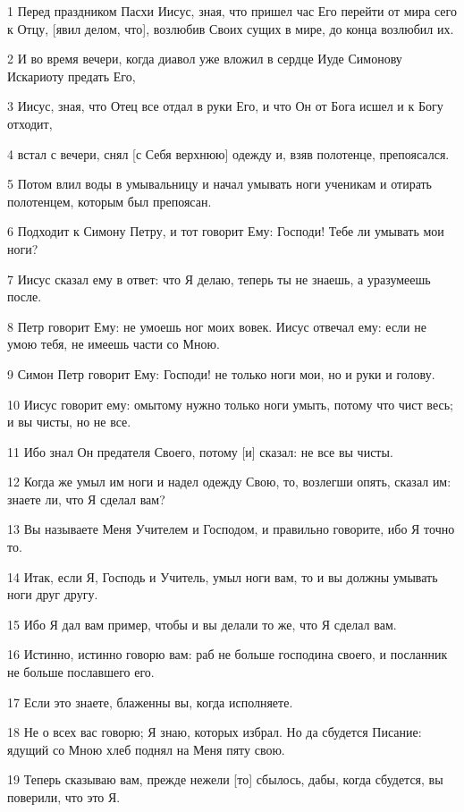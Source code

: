\par 1 Перед праздником Пасхи Иисус, зная, что пришел час Его перейти от мира сего к Отцу, [явил делом, что], возлюбив Своих сущих в мире, до конца возлюбил их.
\par 2 И во время вечери, когда диавол уже вложил в сердце Иуде Симонову Искариоту предать Его,
\par 3 Иисус, зная, что Отец все отдал в руки Его, и что Он от Бога исшел и к Богу отходит,
\par 4 встал с вечери, снял [с Себя верхнюю] одежду и, взяв полотенце, препоясался.
\par 5 Потом влил воды в умывальницу и начал умывать ноги ученикам и отирать полотенцем, которым был препоясан.
\par 6 Подходит к Симону Петру, и тот говорит Ему: Господи! Тебе ли умывать мои ноги?
\par 7 Иисус сказал ему в ответ: что Я делаю, теперь ты не знаешь, а уразумеешь после.
\par 8 Петр говорит Ему: не умоешь ног моих вовек. Иисус отвечал ему: если не умою тебя, не имеешь части со Мною.
\par 9 Симон Петр говорит Ему: Господи! не только ноги мои, но и руки и голову.
\par 10 Иисус говорит ему: омытому нужно только ноги умыть, потому что чист весь; и вы чисты, но не все.
\par 11 Ибо знал Он предателя Своего, потому [и] сказал: не все вы чисты.
\par 12 Когда же умыл им ноги и надел одежду Свою, то, возлегши опять, сказал им: знаете ли, что Я сделал вам?
\par 13 Вы называете Меня Учителем и Господом, и правильно говорите, ибо Я точно то.
\par 14 Итак, если Я, Господь и Учитель, умыл ноги вам, то и вы должны умывать ноги друг другу.
\par 15 Ибо Я дал вам пример, чтобы и вы делали то же, что Я сделал вам.
\par 16 Истинно, истинно говорю вам: раб не больше господина своего, и посланник не больше пославшего его.
\par 17 Если это знаете, блаженны вы, когда исполняете.
\par 18 Не о всех вас говорю; Я знаю, которых избрал. Но да сбудется Писание: ядущий со Мною хлеб поднял на Меня пяту свою.
\par 19 Теперь сказываю вам, прежде нежели [то] сбылось, дабы, когда сбудется, вы поверили, что это Я.
